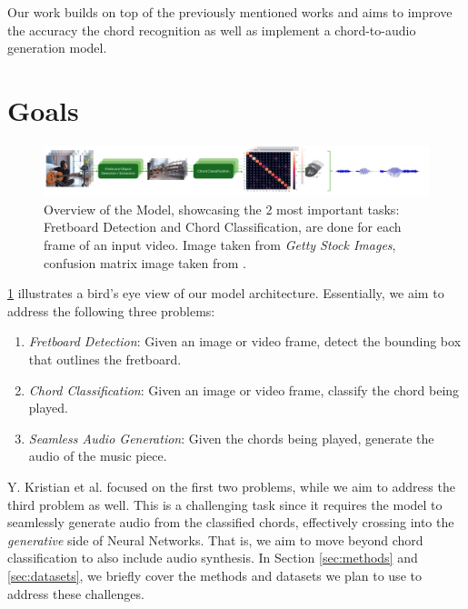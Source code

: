 \documentclass[10pt,twocolumn,letterpaper]{article}
\begin{document}
Our work builds on top of the previously mentioned works \cite{Kristian_Zaman_Tenoyo_Jodhinata_2024}
\cite{du2023conditional} and aims to improve the accuracy the chord recognition as well as implement a chord-to-audio generation model.

\section{Goals}

\begin{figure}[h]
    \centering
    \includegraphics[width=\textwidth]{images/task-diagram.pdf}
    \caption{Overview of the Model, showcasing the 2 most important tasks:
 Fretboard Detection and Chord Classification, are done for each frame of an input video. Image taken from \textit{Getty Stock Images}, confusion matrix image taken from \cite{Kristian_Zaman_Tenoyo_Jodhinata_2024}.}
    \label{fig:model-diagram}
\end{figure}

\cref{fig:model-diagram} illustrates a bird's eye view of our model architecture. Essentially, we aim to address the following three problems:
\begin{enumerate}[label=\arabic*), itemsep=0.25pt]
    \item \emph{Fretboard Detection}: Given an image or video frame, detect the bounding box that outlines the fretboard.
    \item \emph{Chord Classification}: Given an image or video frame, classify the chord being played.
    \item \emph{Seamless Audio Generation}: Given the chords being played, generate the audio of the music piece.
\end{enumerate}
Y. Kristian et al. \cite{Kristian_Zaman_Tenoyo_Jodhinata_2024} focused on the first two problems, while we aim to address the third problem as well. This is a challenging task since it requires the model to seamlessly generate audio from the classified chords, effectively crossing into the \emph{generative} side of Neural Networks. That is, we aim to move beyond chord classification to also include audio synthesis. In Section \cref{sec:methods} and \cref{sec:datasets}, we briefly cover the methods and datasets we plan to use to address these challenges.
\end{document}
